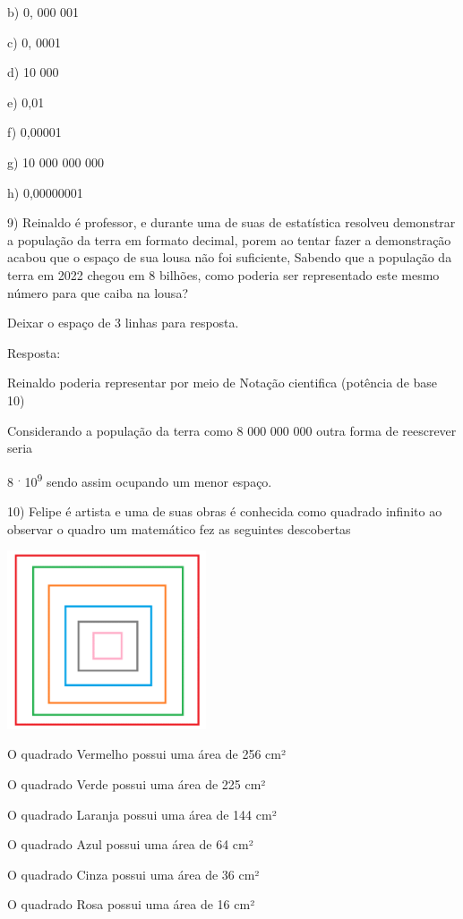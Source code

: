 {b) 0, 000 001

c) 0, 0001

d) 10 000

e) 0,01

f) 0,00001

g) 10 000 000 000

h) 0,00000001

9) Reinaldo é professor, e durante uma de suas de estatística resolveu
demonstrar a população da terra em formato decimal, porem ao tentar
fazer a demonstração acabou que o espaço de sua lousa não foi
suficiente, Sabendo que a população da terra em 2022 chegou em 8
bilhões, como poderia ser representado este mesmo número para que caiba
na lousa?

Deixar o espaço de 3 linhas para resposta.

Resposta:

Reinaldo poderia representar por meio de Notação cientifica (potência de
base 10)

Considerando a população da terra como 8 000 000 000 outra forma de
reescrever seria

8 \textsuperscript{.} 10\textsuperscript{9} sendo assim ocupando um
menor espaço.

10) Felipe é artista e uma de suas obras é conhecida como quadrado
infinito ao observar o quadro um matemático fez as seguintes descobertas

\includegraphics[width=2.3125in,height=2.07917in]{./imgSAEB_8_MAT/media/image2.png}

O quadrado Vermelho possui uma área de 256 cm²

O quadrado Verde possui uma área de 225 cm²

O quadrado Laranja possui uma área de 144 cm²

O quadrado Azul possui uma área de 64 cm²

O quadrado Cinza possui uma área de 36 cm²

O quadrado Rosa possui uma área de 16 cm²

}
